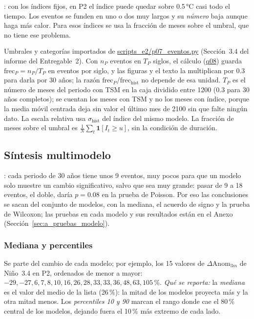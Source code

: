 \documentclass[11pt,a4paper]{article}
\newcommand{\archivo}[1]{\begingroup\hypersetup{urlcolor=black}\url{#1}\endgroup}
\begin{document}
: con los índices fijos, en P2 el índice puede quedar sobre 0.5\,°C casi todo el tiempo.
Los eventos se funden en uno o dos muy largos y su \emph{número} baja aunque haga más calor.
Para esos índices se usa la fracción de meses sobre el umbral, que no tiene ese problema.

Umbrales y categorías importados de \archivo{scripts_e2/p07_eventos.py} (Sección~3.4 del informe del Entregable~2).
Con $n_P$ eventos en $T_P$ siglos, el cálculo (\archivo{q08}) guarda $\mathrm{frec}_P = n_P/T_P$ en eventos por siglo, y las figuras y el texto la multiplican por 0.3 para darla por 30 años; la razón $\mathrm{frec}_P/\mathrm{frec}_{\mathrm{hist}}$ no depende de esa unidad.
$T_P$ es el número de meses del periodo con TSM en la caja dividido entre 1200 (0.3 para 30 años completos); se cuentan los meses con TSM y no los meses con índice, porque la media móvil centrada deja sin valor el último mes de 2100 sin que falte ningún dato.
La escala relativa \citep{shin2022} usa $\sigma_{\mathrm{hist}}$ del índice del mismo modelo.
La fracción de meses sobre el umbral es $\tfrac{1}{N}\sum_t \mathbf{1}[I_t \ge u]$, sin la condición de duración.

\subsection{Síntesis multimodelo}
\label{sec:multimodelo}

: cada periodo de 30 años tiene unos 9 eventos, muy pocos para que un modelo solo muestre un cambio significativo, salvo que sea muy grande: pasar de 9 a 18 eventos, el doble, daría $p = 0.08$ en la prueba de Poisson.
Por eso las conclusiones se sacan del conjunto de modelos, con la mediana, el acuerdo de signo y la prueba de Wilcoxon; las pruebas en cada modelo y sus resultados están en el Anexo (Sección~\ref{sec:a_pruebas_modelo}).

\subsubsection{Mediana y percentiles}

Se parte del cambio de cada modelo; por ejemplo, los 15 valores de $\Delta\mathrm{Anom}_{3m}$ de Niño~3.4 en P2, ordenados de menor a mayor: $-29, -27, 6, 7, 8, 10, 16, 26, 28, 33, 33, 36, 48, 63, 105$\,\%.
\emph{Qué se reporta:} la \emph{mediana} es el valor del medio de la lista (26\,\%): la mitad de los modelos proyecta más y la otra mitad menos.
Los \emph{percentiles 10 y 90} marcan el rango donde cae el 80\,\% central de los modelos, dejando fuera el 10\,\% más extremo de cada lado.
\end{document}
